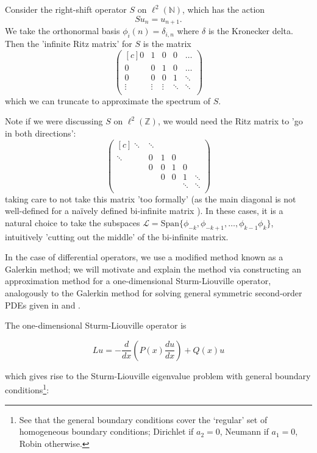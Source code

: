 \documentclass[../main.tex]{subfiles}
\begin{document}
\begin{example}
Consider the right-shift operator $S$ on $\ell^2(\mathbb{N})$, which has the action
  $$Su_{n} = u_{n+1}.$$
We take the orthonormal basis $\phi_i(n) = \delta_{i, n}$ where $\delta$ is the Kronecker delta.
Then the 'infinite Ritz matrix' for $S$ is the matrix
  $$
    \begin{pmatrix*}[c]
      0 & 1 & 0 & 0 & \hdots \\
      0 & 0 & 1 & 0 & \hdots \\
      0 & 0 & 0 & 1 & \ddots \\
      \vdots & \vdots & \vdots & \ddots & \ddots \\ 
    \end{pmatrix*}
  $$
which we can truncate to approximate the spectrum of $S$.
\end{example}
Note if we were discussing $S$ on $\ell^2(\mathbb{Z})$, we would need the Ritz matrix to 'go in
both directions':
  $$
    \begin{pmatrix*}[c]
      \ddots & \ddots & & & \\ 
      \ddots & 0 & 1 & 0 & \\
       & 0 & 0 & 1 & 0 & \\
       & & 0 & 0 & 1 & \ddots \\
       & & & & \ddots & \ddots \\ 
    \end{pmatrix*}
  $$
taking care to not take this matrix 'too formally' (as the main diagonal is not well-defined
for a na\"ively defined bi-infinite matrix \cite{lindner2013where}). In these cases, it is
a natural choice to take the subspaces 
$\mathcal{L} = \text{Span}\{\phi_{-k}, \phi_{-k+1}, \hdots, \phi_{k-1} \phi_k\}$, 
intuitively 'cutting out the middle' of the bi-infinite matrix.

In the case of differential operators, we use a modified method
known as a Galerkin method; we will motivate and
explain the method via constructing an approximation method for a
one-dimensional Sturm-Liouville operator,
analogously to the Galerkin method for solving general symmetric second-order
PDEs given in \cite{suli2003introduction} and \cite{pryce1993numerical}. 

The one-dimensional Sturm-Liouville operator is

$$Lu = - \frac{d}{dx}(P(x)\frac{du}{dx}) + Q(x)u$$ 

which gives rise to the Sturm-Liouville eigenvalue problem with general boundary
conditions\footnote{See that the general boundary conditions cover the `regular'
set of homogeneous boundary conditions; Dirichlet if $a_2 = 0$, Neumann if $a_1
= 0$, Robin otherwise.}:
\end{document}
